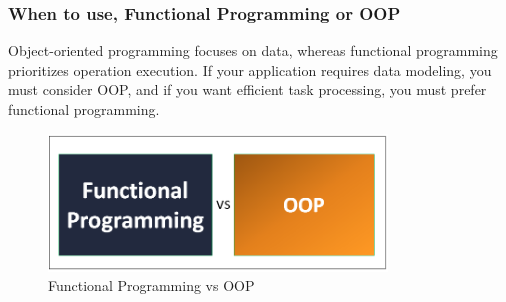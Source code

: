 \documentclass[12pt]{article}
\begin{document}
\subsubsection{When to use, Functional Programming or OOP}
Object-oriented programming focuses on data, whereas functional programming prioritizes operation execution. If your application requires data modeling, you must consider OOP, and if you want efficient task processing, you must prefer functional programming.

\begin{figure}[h!]
\begin{center}
\includegraphics[width=9cm]{Intro5.png}\\
Functional Programming vs OOP
\end{center}
\end{figure}
\end{document}
